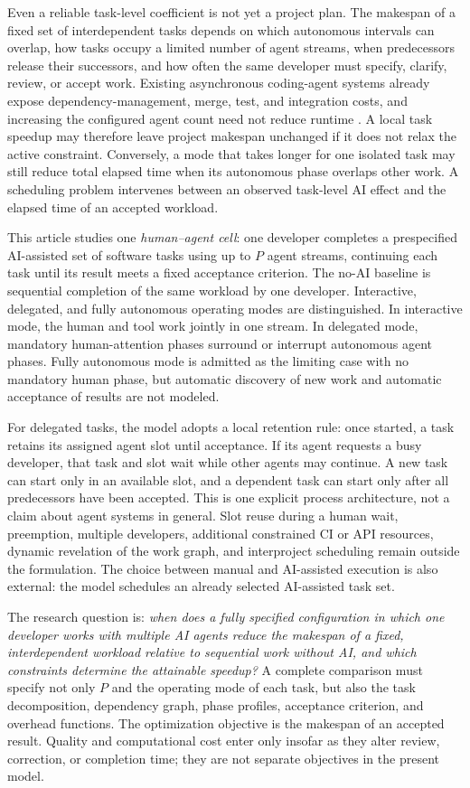 Even a reliable task-level coefficient is not yet a project plan. The makespan
of a fixed set of interdependent tasks depends on which autonomous intervals
can overlap, how tasks occupy a limited number of agent streams, when
predecessors release their successors, and how often the same developer must
specify, clarify, review, or accept work. Existing asynchronous coding-agent
systems already expose dependency-management, merge, test, and integration
costs, and increasing the configured agent count need not reduce runtime
\cite{geng2026caid}. A local task speedup may therefore leave project makespan
unchanged if it does not relax the active constraint. Conversely, a mode that
takes longer for one isolated task may still reduce total elapsed time when its
autonomous phase overlaps other work. A scheduling problem intervenes between
an observed task-level AI effect and the elapsed time of an accepted workload.

This article studies one \emph{human--agent cell}: one developer completes a
prespecified AI-assisted set of software tasks using up to $P$ agent streams,
continuing each task until its result meets a fixed acceptance criterion. The
no-AI baseline is sequential completion of the same workload by one developer.
Interactive, delegated, and fully autonomous operating modes are distinguished.
In interactive mode, the human and tool work jointly in one stream. In
delegated mode, mandatory human-attention phases surround or interrupt
autonomous agent phases. Fully autonomous mode is admitted as the limiting case
with no mandatory human phase, but automatic discovery of new work and
automatic acceptance of results are not modeled.

For delegated tasks, the model adopts a local retention rule: once started, a
task retains its assigned agent slot until acceptance. If its agent requests a
busy developer, that task and slot wait while other agents may continue. A new
task can start only in an available slot, and a dependent task can start only
after all predecessors have been accepted. This is one explicit process
architecture, not a claim about agent systems in general. Slot reuse during a
human wait, preemption, multiple developers, additional constrained CI or API
resources, dynamic revelation of the work graph, and interproject scheduling
remain outside the formulation. The choice between manual and AI-assisted
execution is also external: the model schedules an already selected
AI-assisted task set.

The research question is: \emph{when does a fully specified configuration in
which one developer works with multiple AI agents reduce the makespan of a
fixed, interdependent workload relative to sequential work without AI, and
which constraints determine the attainable speedup?} A complete comparison
must specify not only $P$ and the operating mode of each task, but also the task
decomposition, dependency graph, phase profiles, acceptance criterion, and
overhead functions. The optimization objective is the makespan of an accepted
result. Quality and computational cost enter only insofar as they alter review,
correction, or completion time; they are not separate objectives in the present
model.

